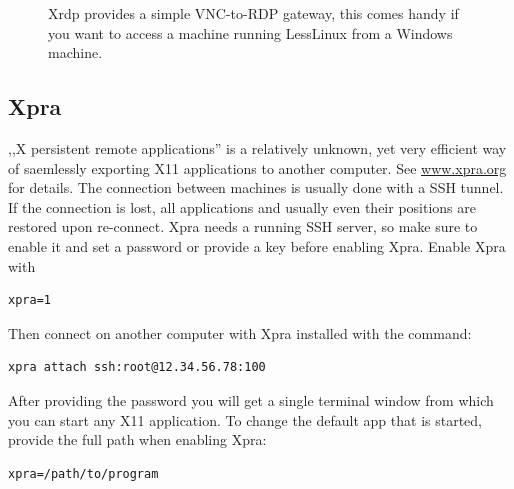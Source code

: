 \begin{figure}[htbp]
\caption{\label{fig:xrdp} Xrdp provides a simple VNC-to-RDP gateway, this comes handy if you want to access a machine running LessLinux from a Windows machine.}
\end{figure}

\subsection{Xpra}

,,X persistent remote applications'' is a relatively unknown, yet very efficient way of saemlessly exporting X11 applications to another computer. See \href{https://www.xpra.org}{www.xpra.org} for details.  The connection between machines is usually done with a SSH tunnel. If the connection is lost, all applications and usually even their positions are restored upon re-connect. Xpra needs a running SSH server, so make sure to enable it and set a password or provide a key before enabling Xpra. Enable Xpra with

\begin{verbatim}
xpra=1
\end{verbatim}

Then connect on another computer with Xpra installed with the command:

\begin{verbatim}
xpra attach ssh:root@12.34.56.78:100 
\end{verbatim}

After providing the password you will get a single terminal window from which you can start any X11 application. To change the default app that is started, provide the full path when enabling Xpra:

\begin{verbatim}
xpra=/path/to/program
\end{verbatim}




